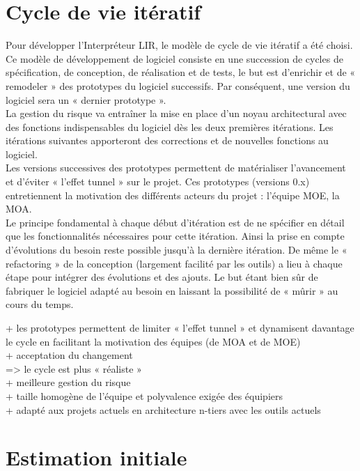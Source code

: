 \documentclass[11pt,a4paper,titlepage,openright]{report}
\begin{document}
    \section{Cycle de vie itératif}
    Pour développer l’Interpréteur LIR, le modèle de cycle de vie itératif a été choisi. Ce modèle de développement de logiciel consiste en une succession de cycles de spécification, de conception, de réalisation et de tests, le but est d’enrichir et de « remodeler » des prototypes du logiciel successifs. Par conséquent, une version du logiciel sera un « dernier prototype ».
    \\La gestion du risque va entraîner la mise en place d’un noyau architectural avec des fonctions indispensables du logiciel dès les deux premières itérations. Les itérations suivantes apporteront des corrections et de nouvelles fonctions au logiciel.
    \\Les versions successives des prototypes permettent de matérialiser l’avancement et d’éviter « l’effet tunnel » sur le projet. Ces prototypes (versions 0.x) entretiennent la motivation des différents acteurs du projet : l’équipe MOE, la MOA.
    \\Le principe fondamental à chaque début d’itération est de ne spécifier en détail que les fonctionnalités nécessaires pour cette itération. Ainsi la prise en compte d’évolutions du besoin reste possible jusqu’à la dernière itération. De même le « refactoring » de la conception (largement facilité par les outils) a lieu à chaque étape pour intégrer des évolutions et des ajouts. Le but étant bien sûr de fabriquer le logiciel adapté au besoin en laissant la possibilité de « mûrir » au cours du temps.

    + les prototypes permettent de limiter « l’effet tunnel » et dynamisent davantage le cycle en facilitant la motivation des équipes (de MOA et de MOE)
    \\ + acceptation du changement
    \\=> le cycle est plus « réaliste »
    \\ + meilleure gestion du risque
    \\ + taille homogène de l’équipe et polyvalence exigée des équipiers
    \\ + adapté aux projets actuels en architecture n-tiers avec les outils actuels

    \section{Estimation initiale}
\end{document}
